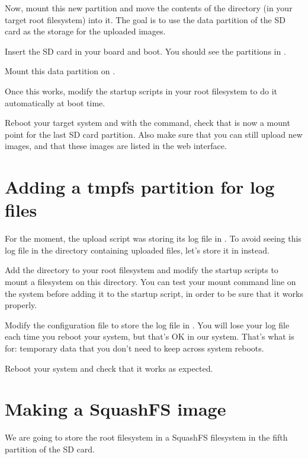 Now, mount this new partition and move the contents of the
 directory (in your target root filesystem) into
it. The goal is to use the data partition of the SD card as the storage
for the uploaded images.

Insert the SD card in your board and boot. You should see the
partitions in .

Mount this data partition on .

Once this works, modify the startup scripts in your root filesystem
to do it automatically at boot time.

Reboot your target system and with the  command, check that
 is now a mount point for the last SD card
partition. Also make sure that you can still upload new images, and
that these images are listed in the web interface.

\section{Adding a tmpfs partition for log files}

For the moment, the upload script was storing its log file in
. To avoid seeing this log file in
the directory containing uploaded files, let's store it in
 instead.

Add the  directory to your root filesystem and modify
the startup scripts to mount a  filesystem on this
directory. You can test your  mount command line on the
system before adding it to the startup script, in order to be sure
that it works properly.

Modify the  configuration file to store
the log file in . You will lose your log
file each time you reboot your system, but that's OK in our
system. That's what  is for: temporary data that you don't need
to keep across system reboots.

Reboot your system and check that it works as expected.

\section{Making a SquashFS image}

We are going to store the root filesystem in a SquashFS filesystem in
the fifth partition of the SD card.

